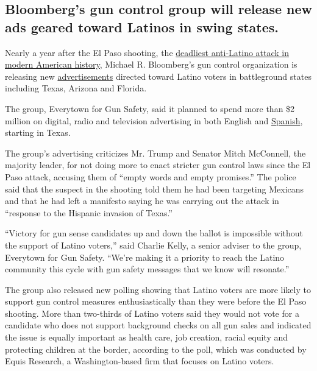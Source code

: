 \hypertarget{bloombergs-gun-control-group-will-release-new-ads-geared-toward-latinos-in-swing-states}{%
\subsection{Bloomberg's gun control group will release new ads geared
toward Latinos in swing
states.}\label{bloombergs-gun-control-group-will-release-new-ads-geared-toward-latinos-in-swing-states}}

Nearly a year after the El Paso shooting, the
\href{https://www.nytimes3xbfgragh.onion/2020/02/06/us/politics/el-paso-shooting-federal-hate-crimes.html}{deadliest
anti-Latino attack in modern American history}, Michael R. Bloomberg's
gun control organization is releasing new
\href{https://youtu.be/UG1oqokLTwU}{advertisements} directed toward
Latino voters in battleground states including Texas, Arizona and
Florida.

The group, Everytown for Gun Safety, said it planned to spend more than
\$2 million on digital, radio and television advertising in both English
and \href{https://youtu.be/Rf-zrBP9b70}{Spanish}, starting in Texas.

The group's advertising criticizes Mr. Trump and Senator Mitch
McConnell, the majority leader, for not doing more to enact stricter gun
control laws since the El Paso attack, accusing them of ``empty words
and empty promises.'' The police said that the suspect in the shooting
told them he had been targeting Mexicans and that he had left a
manifesto saying he was carrying out the attack in ``response to the
Hispanic invasion of Texas.''

``Victory for gun sense candidates up and down the ballot is impossible
without the support of Latino voters,'' said Charlie Kelly, a senior
adviser to the group, Everytown for Gun Safety. ``We're making it a
priority to reach the Latino community this cycle with gun safety
messages that we know will resonate.''

The group also released new polling showing that Latino voters are more
likely to support gun control measures enthusiastically than they were
before the El Paso shooting. More than two-thirds of Latino voters said
they would not vote for a candidate who does not support background
checks on all gun sales and indicated the issue is equally important as
health care, job creation, racial equity and protecting children at the
border, according to the poll, which was conducted by Equis Research, a
Washington-based firm that focuses on Latino voters.

